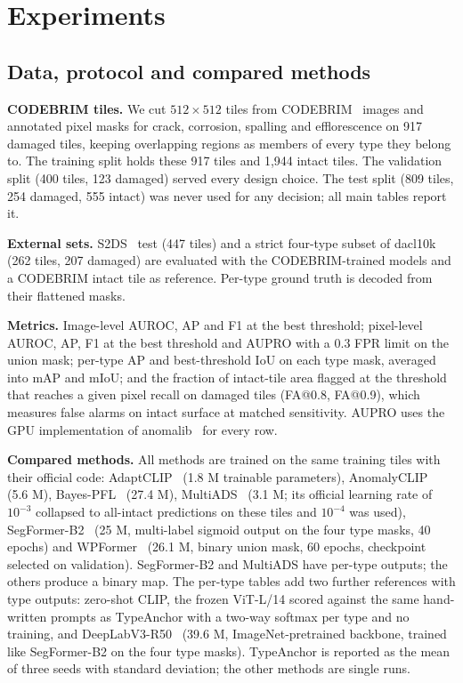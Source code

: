 \documentclass[conference]{IEEEtran}
\newcommand{\ours}{TypeAnchor}
\begin{document}
\section{Experiments}
\label{sec:exp}
\subsection{Data, protocol and compared methods}
\textbf{CODEBRIM tiles.} We cut $512\times512$ tiles from CODEBRIM~\cite{codebrim} images and annotated pixel masks for crack, corrosion, spalling and efflorescence on 917 damaged tiles, keeping overlapping regions as members of every type they belong to. The training split holds these 917 tiles and 1{,}944 intact tiles. The validation split (400 tiles, 123 damaged) served every design choice. The test split (809 tiles, 254 damaged, 555 intact) was never used for any decision; all main tables report it.

\textbf{External sets.} S2DS~\cite{s2ds} test (447 tiles) and a strict four-type subset of dacl10k~\cite{dacl10k} (262 tiles, 207 damaged) are evaluated with the CODEBRIM-trained models and a CODEBRIM intact tile as reference. Per-type ground truth is decoded from their flattened masks.

\textbf{Metrics.} Image-level AUROC, AP and F1 at the best threshold; pixel-level AUROC, AP, F1 at the best threshold and AUPRO with a 0.3 FPR limit on the union mask; per-type AP and best-threshold IoU on each type mask, averaged into mAP and mIoU; and the fraction of intact-tile area flagged at the threshold that reaches a given pixel recall on damaged tiles (FA@0.8, FA@0.9), which measures false alarms on intact surface at matched sensitivity. AUPRO uses the GPU implementation of anomalib~\cite{anomalib} for every row.

\textbf{Compared methods.} All methods are trained on the same training tiles with their official code: AdaptCLIP~\cite{adaptclip} (1.8 M trainable parameters), AnomalyCLIP~\cite{anomalyclip} (5.6 M), Bayes-PFL~\cite{bayespfl} (27.4 M), MultiADS~\cite{multiads} (3.1 M; its official learning rate of $10^{-3}$ collapsed to all-intact predictions on these tiles and $10^{-4}$ was used), SegFormer-B2~\cite{segformer} (25 M, multi-label sigmoid output on the four type masks, 40 epochs) and WPFormer~\cite{wpformer} (26.1 M, binary union mask, 60 epochs, checkpoint selected on validation). SegFormer-B2 and MultiADS have per-type outputs; the others produce a binary map. The per-type tables add two further references with type outputs: zero-shot CLIP, the frozen ViT-L/14 scored against the same hand-written prompts as \ours{} with a two-way softmax per type and no training, and DeepLabV3-R50~\cite{deeplabv3} (39.6 M, ImageNet-pretrained backbone, trained like SegFormer-B2 on the four type masks). \ours{} is reported as the mean of three seeds with standard deviation; the other methods are single runs.
\end{document}
